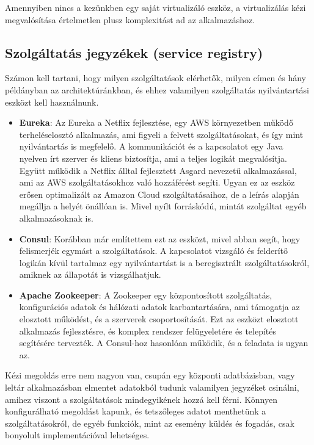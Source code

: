 \documentclass[11pt,magyar,a4paper,twoside,]{report}
\begin{document}
Amennyiben nincs a kezünkben egy saját virtualizáló eszköz, a
virtualizálás kézi megvalósítása értelmetlen plusz komplexitást ad az
alkalmazáshoz.

\subsection{Szolgáltatás jegyzékek (service
registry)}\label{szolguxe1ltatuxe1s-jegyzuxe9kek-service-registry}

Számon kell tartani, hogy milyen szolgáltatások elérhetők, milyen címen
és hány példányban az architektúránkban, és ehhez valamilyen
szolgáltatás nyilvántartási eszközt\citep{service-registry-pattern}
\citep{micro-introPt3} kell használnunk.

\begin{itemize}
\item
  \textbf{Eureka}\citep{eureka-glance}: Az Eureka a Netflix fejlesztése,
  egy AWS környezetben működő terheléselosztó alkalmazás, ami figyeli a
  felvett szolgáltatásokat, és így mint nyilvántartás is megfelelő. A
  kommunikációt és a kapcsolatot egy Java nyelven írt szerver és kliens
  biztosítja, ami a teljes logikát megvalósítja. Együtt működik a
  Netflix álltal fejlesztett Asgard nevezetű alkalmazással, ami az AWS
  szolgáltatásokhoz való hozzáférést segíti. Ugyan ez az eszköz erősen
  optimalizált az Amazon Cloud szolgáltatásaihoz, de a leírás alapján
  megállja a helyét önállóan is. Mivel nyílt forráskódú, mintát
  szolgáltat egyéb alkalmazásoknak is.
\item
  \textbf{Consul}: Korábban már említettem ezt az eszközt, mivel abban
  segít, hogy felismerjék egymást a szolgáltatások. A kapcsolatot
  vizsgáló és felderítő logikán kívül tartalmaz egy nyilvántartást is a
  beregisztrált szolgáltatásokról, amiknek az állapotát is
  vizsgálhatjuk.
\item
  \textbf{Apache Zookeeper}\citep{zookeeper}: A Zookeeper egy
  központosított szolgáltatás, konfigurációs adatok és hálózati adatok
  karbantartására, ami támogatja az elosztott működést, és a szerverek
  csoportosítását. Ezt az eszközt elosztott alkalmazás fejlesztésre, és
  komplex rendszer felügyeletére és telepítés segítésére tervezték. A
  Consul-hoz hasonlóan működik, és a feladata is ugyan az.
\end{itemize}

Kézi megoldás erre nem nagyon van, csupán egy központi adatbázisban,
vagy leltár alkalmazásban elmentet adatokból tudunk valamilyen jegyzéket
csinálni, amihez viszont a szolgáltatások mindegyikének hozzá kell
férni. Könnyen konfigurálható megoldást kapunk, és tetszőleges adatot
menthetünk a szolgáltatásokról, de egyéb funkciók, mint az esemény
küldés és fogadás, csak bonyolult implementációval lehetséges.
\end{document}
